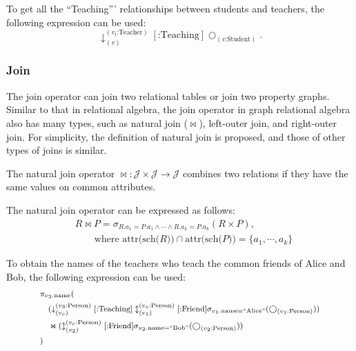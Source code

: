 \begin{example}
    To get all the ``Teaching''' relationships between students and teachers, the following expression can be used:
    \begin{equation*}
        \downarrow_{(v)}^{(v_t\text{:Teacher})}[\text{:Teaching}]\bigcirc_{(v\text{:Student})}.
    \end{equation*}
\end{example}

\subsubsection{Join}

The join operator can join two relational tables or join two property graphs.
Similar to that in relational algebra, the join operator in graph relational algebra also has many types, such as natural join ($\Join$), left-outer join, and right-outer join.
For simplicity, the definition of natural join is proposed, and those of other types of joins is similar.

\begin{definition}
    The natural join operator $\Join : \mathcal{J} \times \mathcal{J} \rightarrow \mathcal{J}$ combines two relations if they have the same values on common attributes.
\end{definition}

The natural join operator can be expressed as follows:
\begin{equation*}
    \begin{split}
        & R \Join P = \sigma_{R.a_1 = P.a_1 \land \cdots \land R.a_k = P.a_k}(R \times P), \\
        & \hspace{2em} \text{where } \text{attr(sch($R$))} \cap \text{attr(sch($P$))} = \{a_1, \cdots, a_k\}
    \end{split}
\end{equation*}

\begin{example}
    To obtain the names of the teachers who teach the common friends of Alice and Bob, the following expression can be used:
    \begin{equation*}
        \footnotesize
        \begin{split}
            & \pi_{v_3\text{.name}}( \\
            & \hspace{1em} (\downarrow_{(v_c)}^{(v_3\text{:Person})}[\text{:Teaching}]\updownarrow_{(v_1)}^{(v_c\text{:Person})}[\text{:Friend}]\sigma_{v_1\text{.name=``Alice''}}(\bigcirc_{(v_1\text{:Person})})) \\
            & \hspace{1em} \Join (\updownarrow_{(v_2)}^{(v_c\text{:Person})}[\text{:Friend}]\sigma_{v_2\text{.name=``Bob''}}(\bigcirc_{(v_2\text{:Person})}))\\ 
            & )
        \end{split}
    \end{equation*}
\end{example}

